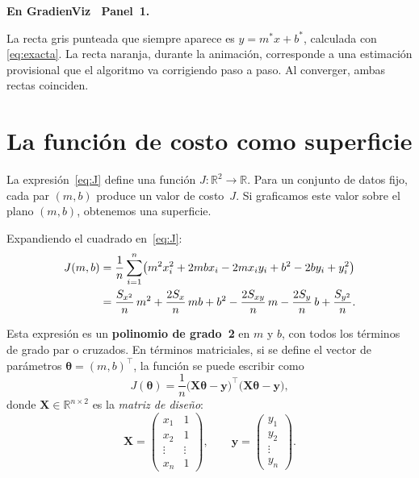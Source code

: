 \documentclass[12pt, a4paper]{article}
\newenvironment{viznota}[1]{%
  \begin{mdframed}[style=vizverde]
  \textbf{\color{bordeteo}En GradienViz \textemdash\ #1.}\quad
}{%
  \end{mdframed}
}
\newcommand{\R}{\mathbb{R}}
\newcommand{\mstar}{m^{*}}
\newcommand{\bstar}{b^{*}}
\newcommand{\Jfun}{J(m,b)}
\newcommand{\T}{{\top}}
\begin{document}
\begin{viznota}{Panel~1}
La recta gris punteada que siempre aparece es $y = \mstar x + \bstar$,
calculada con \eqref{eq:exacta}. La recta naranja, durante la animación,
corresponde a una estimación provisional que el algoritmo va corrigiendo
paso a paso. Al converger, ambas rectas coinciden.
\end{viznota}

\section{La función de costo como superficie}

La expresión~\eqref{eq:J} define una función $J: \R^2 \to \R$.
Para un conjunto de datos fijo, cada par $(m, b)$ produce un valor de costo~$J$.
Si graficamos este valor sobre el plano $(m, b)$, obtenemos una superficie.

Expandiendo el cuadrado en~\eqref{eq:J}:
\begin{align}
  \Jfun &= \frac{1}{n}\sum_{i=1}^{n}
    \bigl(m^2 x_i^2 + 2mb x_i - 2m x_i y_i + b^2 - 2b y_i + y_i^2\bigr) \notag\\
  &= \frac{S_{x^2}}{n}\,m^2 + \frac{2S_x}{n}\,mb + b^2
     - \frac{2S_{xy}}{n}\,m - \frac{2S_y}{n}\,b + \frac{S_{y^2}}{n}.
  \label{eq:Jexpandida}
\end{align}

Esta expresión es un \textbf{polinomio de grado~2} en $m$ y $b$, con
todos los términos de grado par o cruzados. En términos matriciales,
si se define el vector de parámetros $\boldsymbol{\theta} = (m, b)^\T$,
la función se puede escribir como
\begin{equation}\label{eq:Jmatrix}
  J(\boldsymbol{\theta}) = \frac{1}{n}
  \bigl(\mathbf{X}\boldsymbol{\theta} - \mathbf{y}\bigr)^\T
  \bigl(\mathbf{X}\boldsymbol{\theta} - \mathbf{y}\bigr),
\end{equation}
donde $\mathbf{X} \in \R^{n\times 2}$ es la \emph{matriz de diseño}:
\[
  \mathbf{X} = \begin{pmatrix} x_1 & 1 \\ x_2 & 1 \\ \vdots & \vdots \\ x_n & 1 \end{pmatrix},
  \qquad
  \mathbf{y} = \begin{pmatrix} y_1 \\ y_2 \\ \vdots \\ y_n \end{pmatrix}.
\]
\end{document}
